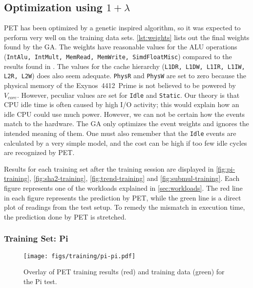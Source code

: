 \subsection{Optimization using $1 + \lambda$}

PET has been optimized by a genetic inspired algorithm, so it was expected to
perform very well on the training data sets. \autoref{lst:weights} lists out the
final weights found by the GA. The weights have reasonable values for the ALU
operations (\texttt{IntAlu, IntMult, MemRead, MemWrite, SimdFloatMisc}) compared
to the results found in \cite{rundehvatum2013exploring}. The values for the
cache hierarchy (\texttt{L1DR, L1DW, L1IR, L1IW, L2R, L2W}) does also seem
adequate. \texttt{PhysR} and \texttt{PhysW} are set to zero because the physical
memory of the Exynos~4412~Prime is not believed to be powered by $V_{core}$.
However, peculiar values are set for \texttt{Idle} and \texttt{Static}. Our
theory is that CPU idle time is often caused by high I/O activity; this would
explain how an idle CPU could use much power. However, we can not be certain how
the events match to the hardware. The GA only optimizes the event weights and
ignores the intended meaning of them. One must also remember that the
\texttt{Idle} events are calculated by a very simple model, and the cost can
be high if too few idle cycles are recognized by PET.



Results for each training set after the training session are displayed in
\autoref{fig:pi-training}, \autoref{fig:sha2-training},
\autoref{fig:trend-training} and \autoref{fig:submul-training}. Each figure
represents one of the workloads explained in \autoref{sec:workloads}. The red
line in each figure represents the prediction by PET, while the green line is a
direct plot of readings from the test setup. To remedy the mismatch in execution
time, the prediction done by PET is stretched.


\newpage

\subsubsection{Training Set: Pi}
\begin{figure}[htb]
    \centering
    \texttt{[image: figs/training/pi-pi.pdf]}
    \caption{Overlay of PET training results (red) and training data (green) for the Pi test.}
    \label{fig:pi-training}
\end{figure}

